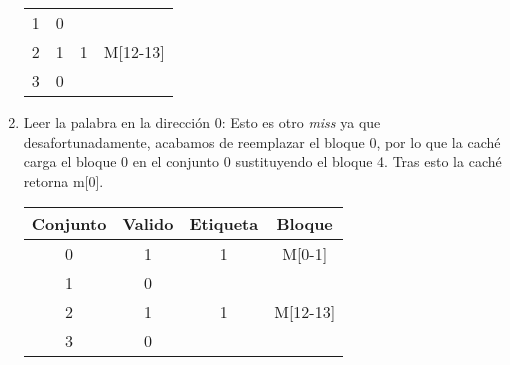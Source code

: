 \begin{ejemplo}
\begin{enumerate}
\begin{center}
\begin{tabular}{cccc}
    1 & 0 & & \\
    2 & 1 & 1 & M[12-13] \\
    3 & 0 & & \\
\end{tabular}
\end{center}
\item Leer la palabra en la dirección 0: Esto es otro \textit{miss} ya que desafortunadamente, acabamos de reemplazar el bloque 0, por lo que la caché carga el bloque 0 en el conjunto 0 sustituyendo el bloque 4. Tras esto la caché retorna m[0].
        \begin{center}
\begin{tabular}{cccc}
    Conjunto & Valido & Etiqueta & Bloque \\
    \hline
    0 & 1 & 1 & M[0-1] \\
    1 & 0 & & \\
    2 & 1 & 1 & M[12-13] \\
    3 & 0 & & \\
\end{tabular}
\end{center}
\end{enumerate}
\end{ejemplo}

